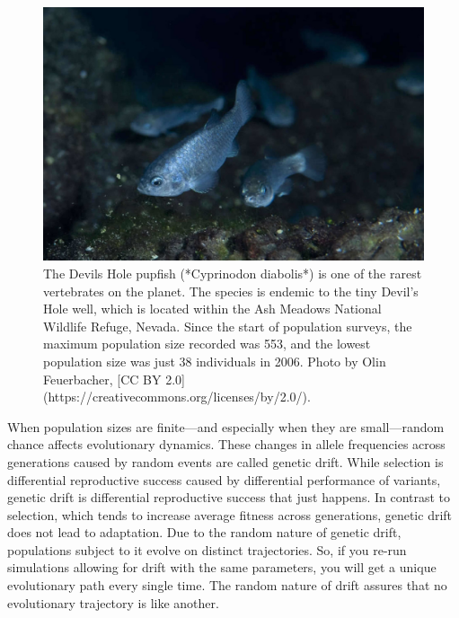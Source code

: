\documentclass[
]{book}
\begin{document}
\begin{figure}
\includegraphics[width=1\linewidth]{images/devilshole} \caption{The Devils Hole pupfish (*Cyprinodon diabolis*) is one of the rarest vertebrates on the planet. The species is endemic to the tiny Devil's Hole well, which is located within the Ash Meadows National Wildlife Refuge, Nevada. Since the start of population surveys, the maximum population size recorded was 553, and the lowest population size was just 38 individuals in 2006. Photo by Olin Feuerbacher, [CC BY 2.0](https://creativecommons.org/licenses/by/2.0/).}\label{fig:devilshole}
\end{figure}

When population sizes are finite---and especially when they are small---random chance affects evolutionary dynamics. These changes in allele frequencies across generations caused by random events are called genetic drift. While selection is differential reproductive success caused by differential performance of variants, genetic drift is differential reproductive success that just happens. In contrast to selection, which tends to increase average fitness across generations, genetic drift does not lead to adaptation. Due to the random nature of genetic drift, populations subject to it evolve on distinct trajectories. So, if you re-run simulations allowing for drift with the same parameters, you will get a unique evolutionary path every single time. The random nature of drift assures that no evolutionary trajectory is like another.
\end{document}

